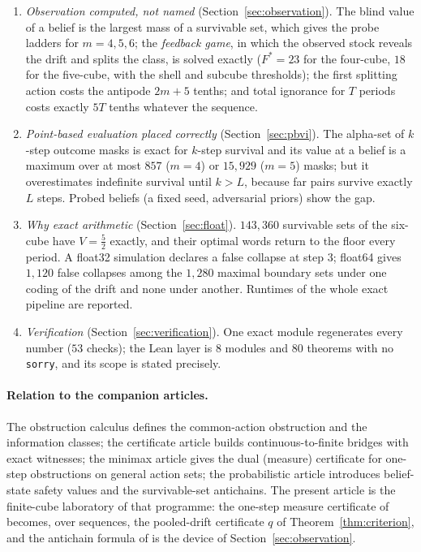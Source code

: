\documentclass[11pt,a4paper]{article}
\theoremstyle{plain}
\theoremstyle{definition}
\theoremstyle{remark}
\newcommand{\NCHECKS}{53}
\newcommand{\tfr}[2]{\tfrac{#1}{#2}}
\newcommand{\Fstar}{F^{\ast}}
\begin{document}
\begin{enumerate}[leftmargin=2em,itemsep=1pt]
\item \emph{Observation computed, not named} (Section~\ref{sec:observation}). The blind value of a belief is the largest mass of a survivable set, which gives the probe ladders for $m=4,5,6$; the \emph{feedback game}, in which the observed stock reveals the drift and splits the class, is solved exactly ($\Fstar=23$ for the four-cube, $18$ for the five-cube, with the shell and subcube thresholds); the first splitting action costs the antipode $2m+5$ tenths; and total ignorance for $T$ periods costs exactly $5T$ tenths whatever the sequence.
\item \emph{Point-based evaluation placed correctly} (Section~\ref{sec:pbvi}). The alpha-set of $k$-step outcome masks is exact for $k$-step survival and its value at a belief is a maximum over at most $857$ ($m=4$) or $15{,}929$ ($m=5$) masks; but it overestimates indefinite survival until $k>L$, because far pairs survive exactly $L$ steps. Probed beliefs (a fixed seed, adversarial priors) show the gap.
\item \emph{Why exact arithmetic} (Section~\ref{sec:float}). $143{,}360$ survivable sets of the six-cube have $V=\tfr52$ exactly, and their optimal words return to the floor every period. A float32 simulation declares a false collapse at step $3$; float64 gives $1{,}120$ false collapses among the $1{,}280$ maximal boundary sets under one coding of the drift and none under another. Runtimes of the whole exact pipeline are reported.
\item \emph{Verification} (Section~\ref{sec:verification}). One exact module regenerates every number ($\NCHECKS$ checks); the Lean layer is $8$ modules and $80$ theorems with no \texttt{sorry}, and its scope is stated precisely.
\end{enumerate}

\paragraph{Relation to the companion articles.}
The obstruction calculus \cite{Abaee2026calc} defines the common-action obstruction and the information classes; the certificate article \cite{Abaee2026cert} builds continuous-to-finite bridges with exact witnesses; the minimax article \cite{Abaee2026minimax} gives the dual (measure) certificate for one-step obstructions on general action sets; the probabilistic article \cite{Abaee2026prob} introduces belief-state safety values and the survivable-set antichains. The present article is the finite-cube laboratory of that programme: the one-step measure certificate of \cite{Abaee2026minimax} becomes, over sequences, the pooled-drift certificate $q$ of Theorem~\ref{thm:criterion}, and the antichain formula of \cite{Abaee2026prob} is the device of Section~\ref{sec:observation}.
\end{document}
